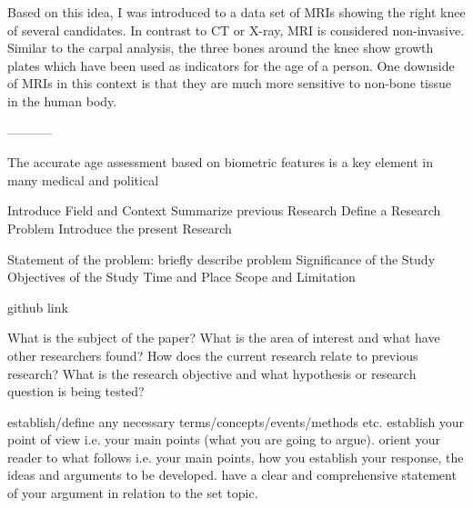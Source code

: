 Based on this idea, I was introduced to a data set of MRIs showing the right knee of several candidates. In contrast to CT or X-ray, MRI is considered non-invasive. Similar to the carpal analysis, the three bones around the knee show growth plates which have been used as indicators for the age of a person. One downside of MRIs in this context is that they are much more sensitive to non-bone tissue in the human body. 

-----------

The accurate age assessment based on biometric features is a key element in many medical and political

Introduce Field and Context
Summarize previous Research
Define a Research Problem
Introduce the present Research

Statement of the problem: briefly describe problem
Significance of the Study
Objectives of the Study
Time and Place
Scope and Limitation

github link

What is the subject of the paper?
What is the area of interest and what have other researchers found?
How does the current research relate to previous research?
What is the research objective and what hypothesis or research question is being tested?

establish/define any necessary terms/concepts/events/methods etc.
establish your point of view i.e. your main points (what you are going to argue).
orient your reader to what follows i.e. your main points, how you establish your response, the ideas and arguments to be developed.
have a clear and comprehensive statement of your argument in relation to the set topic.

\newpage
